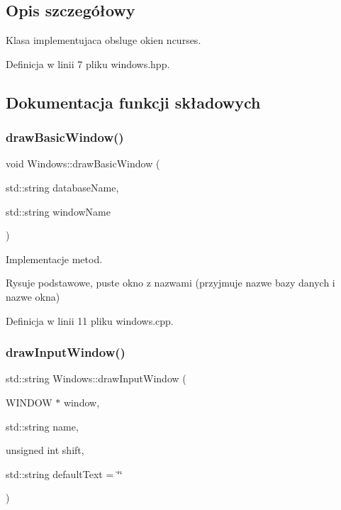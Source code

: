 \subsection{Opis szczegółowy}
Klasa implementujaca obsluge okien ncurses. 

Definicja w linii 7 pliku windows.\+hpp.



\subsection{Dokumentacja funkcji składowych}
\mbox{\label{class_windows_ac98bb248e4b0ca214f4d20ab656073d4}} 
\subsubsection{\texorpdfstring{draw\+Basic\+Window()}{drawBasicWindow()}}
{\footnotesize\ttfamily void Windows\+::draw\+Basic\+Window (\begin{DoxyParamCaption}\item[{std\+::string}]{database\+Name,  }\item[{std\+::string}]{window\+Name }\end{DoxyParamCaption})\hspace{0.3cm}{\ttfamily [static]}}



Implementacje metod. 

Rysuje podstawowe, puste okno z nazwami (przyjmuje nazwe bazy danych i nazwe okna) 

Definicja w linii 11 pliku windows.\+cpp.

\mbox{\label{class_windows_a4f328c05c0eabb280128ed123d99bf7c}} 
\subsubsection{\texorpdfstring{draw\+Input\+Window()}{drawInputWindow()}}
{\footnotesize\ttfamily std\+::string Windows\+::draw\+Input\+Window (\begin{DoxyParamCaption}\item[{W\+I\+N\+D\+OW $\ast$}]{window,  }\item[{std\+::string}]{name,  }\item[{unsigned int}]{shift,  }\item[{std\+::string}]{default\+Text = {\ttfamily \char`\"{}\char`\"{}} }\end{DoxyParamCaption})\hspace{0.3cm}{\ttfamily [static]}}

